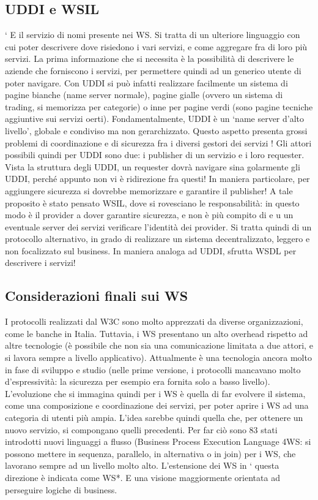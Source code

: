 \subsection{UDDI e WSIL}
`
E il servizio di nomi presente nei WS. Si tratta di un ulteriore linguaggio con
cui poter descrivere dove risiedono i vari servizi, e come aggregare fra di loro
più servizi. La prima informazione che si necessita è la possibilità di descrivere
le aziende che forniscono i servizi, per permettere quindi ad un generico utente
di poter navigare.
Con UDDI si può infatti realizzare facilmente un sistema di pagine bianche
(name server normale), pagine gialle (ovvero un sistema di trading, si memorizza per categorie) o inne per pagine verdi
(sono pagine tecniche aggiuntive
sui servizi oerti). Fondamentalmente, UDDI è un {`}name server d'alto livello',
globale e condiviso ma non gerarchizzato. Questo aspetto presenta grossi problemi di coordinazione e di sicurezza fra i
diversi gestori dei servizi !
Gli attori possibili quindi per UDDI sono due: i publisher di un servizio e i
loro requester. Vista la struttura degli UDDI, un requester dovrà navigare sina
golarmente gli UDDI, perché appunto non vi è ridirezione fra questi! In maniera
particolare, per aggiungere sicurezza si dovrebbe memorizzare e garantire il publisher!
A tale proposito è stato pensato WSIL, dove si rovesciano le responsabilità:
in questo modo è il provider a dover garantire sicurezza, e non è più compito di
e u
un eventuale server dei servizi verificare l'identità dei provider. Si tratta quindi
di un protocollo alternativo, in grado di realizzare un sistema decentralizzato,
leggero e non focalizzato sul business. In maniera analoga ad UDDI, sfrutta
WSDL per descrivere i servizi!
\subsection{Considerazioni finali sui WS}
I protocolli realizzati dal W3C sono molto apprezzati da diverse organizzazioni,
come le banche in Italia. Tuttavia, i WS presentano un alto overhead rispetto ad
altre tecnologie (è possibile che non sia una comunicazione limitata a due attori,
e si lavora sempre a livello applicativo). Attualmente è una tecnologia ancora
molto in fase di sviluppo e studio (nelle prime versione, i protocolli mancavano
molto d'espressività: la sicurezza per esempio era fornita solo a basso livello).
L'evoluzione che si immagina quindi per i WS è quella di far evolvere il
sistema, come una composizione e coordinazione dei servizi, per poter aprire i
WS ad una categoria di utenti più ampia. L'idea sarebbe quindi quella che, per
ottenere un nuovo servizio, si compongano quelli precedenti. Per far ciò sono
83
stati introdotti nuovi linguaggi a flusso (Business Process Execution Language
4WS: si possono mettere in sequenza, parallelo, in alternativa o in join) per
i WS, che lavorano sempre ad un livello molto alto. L'estensione dei WS in
`
questa direzione è indicata come WS*. E una visione maggiormente orientata
ad perseguire logiche di business.

